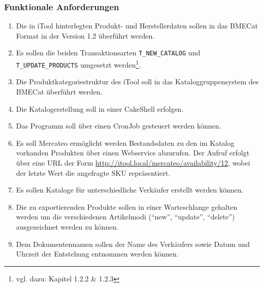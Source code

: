 		\subsubsection{Funktionale Anforderungen}
		\begin{enumerate}[noitemsep]
		\item Die in iTool hinterlegten Produkt- und Herstellerdaten sollen in das BMECat Format in der Version 1.2 überführt werden. 
		\item Es sollen die beiden Transaktionsarten \texttt{T\_NEW\_CATALOG} und \texttt{T\_UPDATE\_PRODUCTS} umgesetzt werden\footnote{vgl. dazu: Kapitel 1.2.2 \& 1.2.3}.
		\item Die Produktkategoriestruktur des iTool soll in das Kataloggruppensystem des BMECat überführt werden.
		\item Die Katalogerstellung soll in einer CakeShell erfolgen.
		\item Das Programm soll über einen CronJob gesteuert werden können.
		\item Es soll Mercateo ermöglicht werden Bestandsdaten zu den im Katalog vorhanden Produkten über einen Webservice abzurufen. Der Aufruf erfolgt über eine URL der Form \url{http://itool.local/mercateo/availability/12}, wobei der letzte Wert die angefragte SKU repräsentiert. 
		\item Es sollen Kataloge für unterschiedliche Verkäufer erstellt werden können.
		\item Die zu exportierenden Produkte sollen in einer Warteschlange gehalten werden um die verschiedenen Artikelmodi (\enquote{new}, \enquote{update}, \enquote{delete}) ausgezeichnet werden zu können.
		\item Dem Dokumentennamen sollen der Name des Verkäufers sowie Datum und Uhrzeit der Entstehung entnommen werden können.
		
		\end{enumerate}
